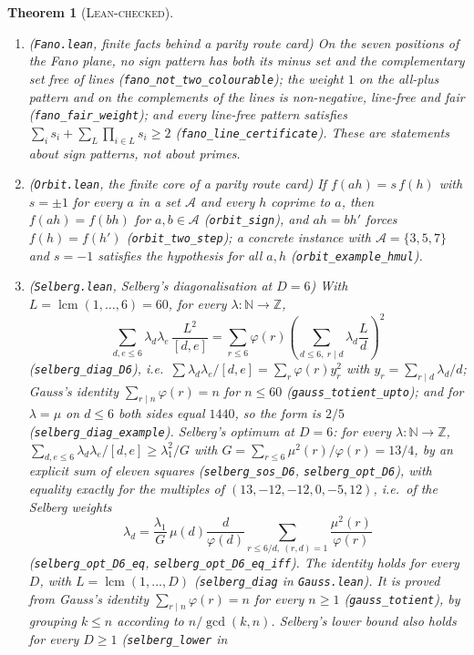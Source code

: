 \documentclass[11pt]{amsart}
\newtheorem{theorem}{Theorem}
\theoremstyle{definition}
\theoremstyle{remark}
\newcommand{\lbl}[1]{\textup{\textsc{#1}}}
\begin{document}
\begin{theorem}[\lbl{Lean-checked}]
\begin{enumerate}
\item (\texttt{Fano.lean}, finite facts behind a parity route card) On the
seven positions of the Fano plane, no sign pattern has both its minus set and
the complementary set free of lines (\texttt{fano\_not\_two\_colourable}); the
weight $1$ on the all-plus pattern and on the complements of the lines is
non-negative, line-free and fair (\texttt{fano\_fair\_weight}); and every
line-free pattern satisfies $\sum_is_i+\sum_L\prod_{i\in L}s_i\ge2$
(\texttt{fano\_line\_certificate}). These are statements about sign patterns,
not about primes.
\item (\texttt{Orbit.lean}, the finite core of a parity route card) If
$f(ah)=s\,f(h)$ with $s=\pm1$ for every $a$ in a set $\mathcal A$ and every $h$
coprime to $a$, then $f(ah)=f(bh)$ for $a,b\in\mathcal A$
(\texttt{orbit\_sign}), and $ah=bh'$ forces $f(h)=f(h')$
(\texttt{orbit\_two\_step}); a concrete instance with $\mathcal A=\{3,5,7\}$
and $s=-1$ satisfies the hypothesis for all $a,h$
(\texttt{orbit\_example\_hmul}).
\item (\texttt{Selberg.lean}, Selberg's diagonalisation at $D=6$) With
$L=\operatorname{lcm}(1,\dots,6)=60$, for every $\lambda:\mathbb N\to\mathbb Z$,
\[
\sum_{d,e\le6}\lambda_d\lambda_e\,\frac{L^2}{[d,e]}=\sum_{r\le6}\varphi(r)\left(\sum_{d\le6,\ r\mid d}\lambda_d\frac Ld\right)^2
\]
(\texttt{selberg\_diag\_D6}), i.e.\ $\sum\lambda_d\lambda_e/[d,e]=\sum_r\varphi(r)y_r^2$
with $y_r=\sum_{r\mid d}\lambda_d/d$; Gauss's identity $\sum_{r\mid n}\varphi(r)=n$
for $n\le60$ (\texttt{gauss\_totient\_upto}); and for $\lambda=\mu$ on $d\le6$
both sides equal $1440$, so the form is $2/5$ (\texttt{selberg\_diag\_example}).
Selberg's optimum at $D=6$: for every $\lambda:\mathbb N\to\mathbb Z$,
$\sum_{d,e\le6}\lambda_d\lambda_e/[d,e]\ge\lambda_1^2/G$ with
$G=\sum_{r\le6}\mu^2(r)/\varphi(r)=13/4$, by an explicit sum of eleven squares
(\texttt{selberg\_sos\_D6}, \texttt{selberg\_opt\_D6}), with equality exactly for
the multiples of $(13,-12,-12,0,-5,12)$, i.e.\ of the Selberg weights
\[\lambda_d=\frac{\lambda_1}{G}\,\mu(d)\frac{d}{\varphi(d)}\sum_{r\le 6/d,\ (r,d)=1}\frac{\mu^2(r)}{\varphi(r)}\]
(\texttt{selberg\_opt\_D6\_eq}, \texttt{selberg\_opt\_D6\_eq\_iff}).
The identity holds for \emph{every} $D$, with $L=\operatorname{lcm}(1,\dots,D)$
(\texttt{selberg\_diag} in \texttt{Gauss.lean}). It is proved from Gauss's
identity $\sum_{r\mid n}\varphi(r)=n$ for every $n\ge1$
(\texttt{gauss\_totient}), by grouping $k\le n$ according to $n/\gcd(k,n)$.
Selberg's lower bound also holds for every $D\ge1$ (\texttt{selberg\_lower} in

\end{enumerate}
\end{theorem}
\end{document}
